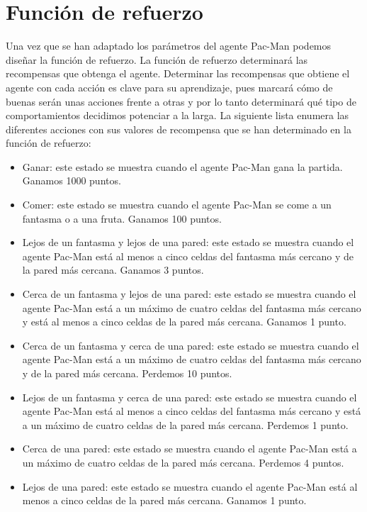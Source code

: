 \documentclass[11pt]{exam}
\begin{document}
\section{Función de refuerzo}\label{refuerzo}

Una vez que se han adaptado los parámetros del agente Pac-Man podemos diseñar la función de refuerzo. La función de refuerzo determinará las recompensas que obtenga el agente. Determinar las recompensas que obtiene el agente con cada acción es clave para su aprendizaje, pues marcará cómo de buenas serán unas acciones frente a otras y por lo tanto determinará qué tipo de comportamientos decidimos potenciar a la larga. La siguiente lista enumera las diferentes acciones con sus valores de recompensa que se han determinado en la función de refuerzo:

\begin{itemize}
	\item Ganar: este estado se muestra cuando el agente Pac-Man gana la partida. Ganamos 1000 puntos.
	\item Comer: este estado se muestra cuando el agente Pac-Man se come a un fantasma o a una fruta. Ganamos 100 puntos.
	\item Lejos de un fantasma y lejos de una pared: este estado se muestra cuando el agente Pac-Man está al menos a cinco celdas del fantasma más cercano y de la pared más cercana. Ganamos 3 puntos.
	\item Cerca de un fantasma y lejos de una pared: este estado se muestra cuando el agente Pac-Man está a un máximo de cuatro celdas del fantasma más cercano y está al menos a cinco celdas de la pared más cercana. Ganamos 1 punto.
	\item Cerca de un fantasma y cerca de una pared: este estado se muestra cuando el agente Pac-Man está a un máximo de cuatro celdas del fantasma más cercano y de la pared más cercana. Perdemos 10 puntos.
	\item Lejos de un fantasma y cerca de una pared: este estado se muestra cuando el agente Pac-Man está al menos a cinco celdas del fantasma más cercano y está a un máximo de cuatro celdas de la pared más cercana. Perdemos 1 punto.
	\item Cerca de una pared: este estado se muestra cuando el agente Pac-Man está a un máximo de cuatro celdas de la pared más cercana. Perdemos 4 puntos.
	\item Lejos de una pared: este estado se muestra cuando el agente Pac-Man está al menos a cinco celdas de la pared más cercana. Ganamos 1 punto.
\end{itemize}
\end{document}
